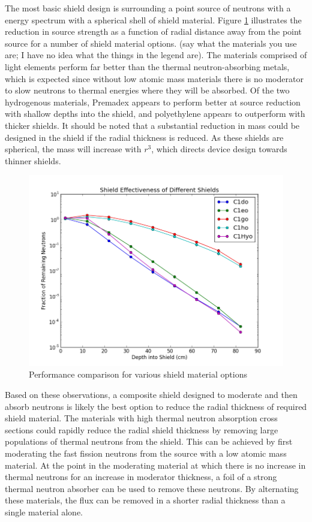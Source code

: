 \documentclass{mc2015}
\begin{document}
The most basic shield design is surrounding a point source of neutrons with a  energy spectrum with a spherical shell of shield material. Figure \ref{fig:basics} illustrates the reduction in source strength as a function of radial distance away from the point source for a number of shield material options. (say what the materials you use are; I have no idea what the things in the legend are). %
The materials comprised of light elements perform far better than the thermal neutron-absorbing metals, which is expected since without low atomic mass materials there is no moderator to slow neutrons to thermal energies where they will be absorbed. Of the two hydrogenous materials, Premadex appears to perform better at source reduction with shallow depths into the shield, and polyethylene appears to outperform with thicker shields. It should be noted that a substantial reduction in mass could be designed in the shield if the radial thickness is reduced. As these shields are spherical, the mass will increase with $r^3$, which directs device design towards thinner shields.  

\begin{figure}
  \centering
  \includegraphics[width=4.5in]{Basics.png}
  \caption{Performance comparison for various shield material options}
  \label{fig:basics}
\end{figure}

Based on these observations, a composite shield designed to moderate and then absorb neutrons is likely the best option to reduce the radial thickness of required shield material. The materials with high thermal neutron absorption cross sections could rapidly reduce the radial shield thickness by removing large populations of thermal neutrons from the shield. This can be achieved by first moderating the fast fission neutrons from the  source with a low atomic mass material. At the point in the moderating material at which there is no increase in thermal neutrons for an increase in moderator thickness, a foil of a strong thermal neutron absorber can be used to remove these neutrons. By alternating these materials, the flux can be removed in a shorter radial thickness than a single material alone. 
\end{document}
